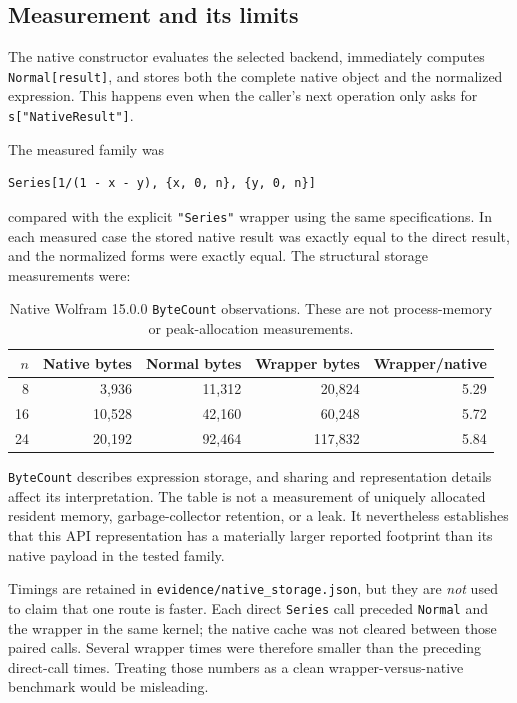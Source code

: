 \documentclass[11pt]{article}
\newcommand{\code}[1]{\texttt{#1}}
\begin{document}
\subsection{Measurement and its limits}
The native constructor evaluates the selected backend, immediately computes \code{Normal[result]}, and stores both the complete native object and the normalized expression. This happens even when the caller's next operation only asks for \code{s["NativeResult"]}.\cite{bridge}

The measured family was
\begin{lstlisting}
Series[1/(1 - x - y), {x, 0, n}, {y, 0, n}]
\end{lstlisting}
compared with the explicit \code{"Series"} wrapper using the same specifications. In each measured case the stored native result was exactly equal to the direct result, and the normalized forms were exactly equal. The structural storage measurements were:

\begin{table}[htbp]
\centering
\begin{tabular}{rrrrr}
\toprule
$n$ & Native bytes & Normal bytes & Wrapper bytes & Wrapper/native\\
\midrule
8  & 3,936 & 11,312 & 20,824 & 5.29\\
16 & 10,528 & 42,160 & 60,248 & 5.72\\
24 & 20,192 & 92,464 & 117,832 & 5.84\\
\bottomrule
\end{tabular}
\caption{Native Wolfram 15.0.0 \code{ByteCount} observations. These are not process-memory or peak-allocation measurements.}
\label{tab:memory}
\end{table}

\code{ByteCount} describes expression storage, and sharing and representation details affect its interpretation. The table is not a measurement of uniquely allocated resident memory, garbage-collector retention, or a leak. It nevertheless establishes that this API representation has a materially larger reported footprint than its native payload in the tested family.\cite{wlbytecount}

Timings are retained in \code{evidence/native\_storage.json}, but they are \emph{not} used to claim that one route is faster. Each direct \code{Series} call preceded \code{Normal} and the wrapper in the same kernel; the native cache was not cleared between those paired calls. Several wrapper times were therefore smaller than the preceding direct-call times. Treating those numbers as a clean wrapper-versus-native benchmark would be misleading.
\end{document}
